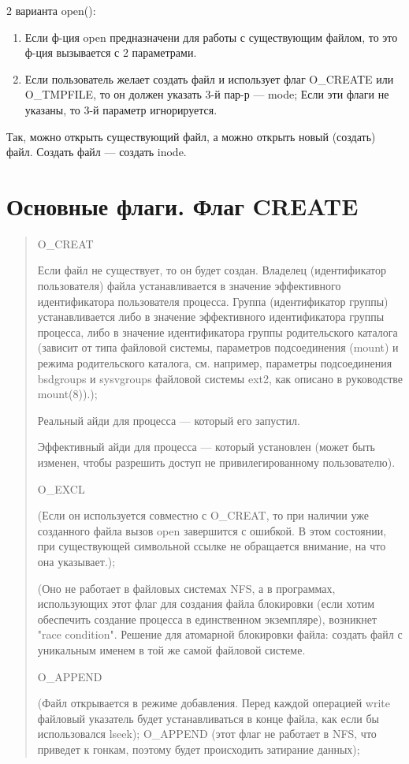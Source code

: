 2 варианта open():
\begin{enumerate}
    \item Если ф-ция open предназначени для работы с существующим файлом, то это ф-ция вызывается с 2 параметрами.
    \item Если пользователь желает создать файл и использует флаг O\_CREATE или O\_TMPFILE, то он должен указать 3-й пар-р --- mode; Если эти флаги не указаны, то 3-й параметр игнорируется.
\end{enumerate}

Так, можно открыть существующий файл, а можно открыть новый (создать) файл. Создать файл --- создать inode.


\section{Основные флаги. Флаг CREATE}

\begin{quote}

O\_CREAT

Если файл не существует, то он будет создан. Владелец (идентификатор пользователя) файла устанавливается в значение эффективного идентификатора пользователя процесса. Группа (идентификатор группы) устанавливается либо в значение эффективного идентификатора группы процесса, либо в значение идентификатора группы родительского каталога (зависит от типа файловой системы, параметров подсоединения (mount) и режима родительского каталога, см. например, параметры подсоединения bsdgroups и sysvgroups файловой системы ext2, как описано в руководстве mount(8)).);

Реальный айди для процесса --- который его запустил.

Эффективный айди для процесса --- который установлен (может быть изменен, чтобы разрешить доступ не привилегированному пользователю).

O\_EXCL

(Если он используется совместно с O\_CREAT, то при наличии уже созданного файла вызов open завершится с ошибкой. В этом состоянии, при существующей символьной ссылке не обращается внимание, на что она указывает.);

(Оно не работает в файловых системах NFS, а в программах, использующих этот флаг для создания файла блокировки (если хотим обеспечить создание процесса в единственном экземпляре), возникнет "race condition". Решение для атомарной блокировки файла: создать файл с уникальным именем в той же самой файловой системе.

O\_APPEND

(Файл открывается в режиме добавления. Перед каждой операцией write файловый указатель будет устанавливаться в конце файла, как если бы использовался lseek); O\_APPEND (этот флаг не работает в NFS, что приведет к гонкам, поэтому будет происходить затирание данных);

\end{quote}

